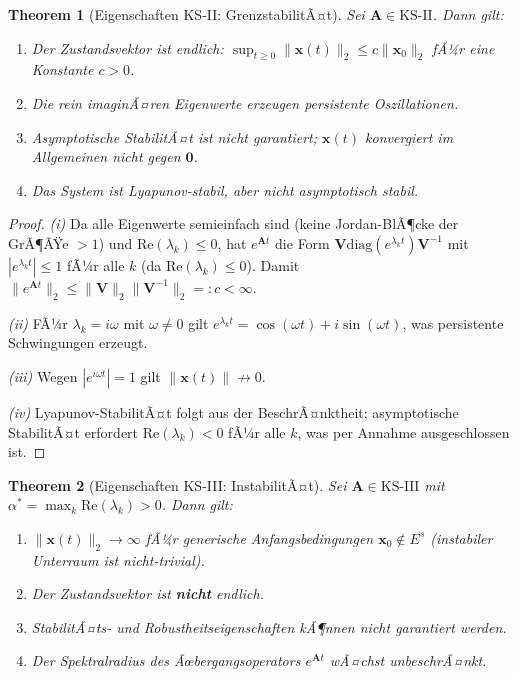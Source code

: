 ﻿\documentclass[12pt, a4paper, titlepage]{report}
\newtheorem{theorem}{Theorem}[section]
\theoremstyle{definition}
\theoremstyle{remark}
\newcommand{\vx}{\bm{x}}
\newcommand{\vA}{\bm{A}}
\newcommand{\vV}{\bm{V}}
\newcommand{\re}{\mathrm{Re}}
\newcommand{\diag}{\mathrm{diag}}
\newcommand{\KS}{\mathrm{KS}}
\begin{document}
\begin{theorem}[Eigenschaften KS-II: GrenzstabilitÃ¤t]
\label{thm:ks2}
Sei $\vA \in \KS\text{-II}$. Dann gilt:
\begin{enumerate}[label=(\roman*)]
  \item Der Zustandsvektor ist endlich: $\sup_{t\geq 0}\|\vx(t)\|_2 \leq c\|\vx_0\|_2$
    fÃ¼r eine Konstante $c > 0$.
  \item Die rein imaginÃ¤ren Eigenwerte erzeugen persistente Oszillationen.
  \item Asymptotische StabilitÃ¤t ist nicht garantiert; $\vx(t)$ konvergiert im
    Allgemeinen nicht gegen $\bm{0}$.
  \item Das System ist Lyapunov-stabil, aber nicht asymptotisch stabil.
\end{enumerate}
\end{theorem}

\begin{proof}
\textit{(i)} Da alle Eigenwerte semieinfach sind (keine Jordan-BlÃ¶cke der GrÃ¶ÃŸe $> 1$)
und $\re(\lambda_k) \leq 0$, hat $e^{\vA t}$ die Form $\vV\diag(e^{\lambda_k t})\vV^{-1}$
mit $|e^{\lambda_k t}| \leq 1$ fÃ¼r alle $k$ (da $\re(\lambda_k) \leq 0$). Damit
$\|e^{\vA t}\|_2 \leq \|\vV\|_2\|\vV^{-1}\|_2 =: c < \infty$.

\textit{(ii)} FÃ¼r $\lambda_k = i\omega$ mit $\omega \neq 0$ gilt
$e^{\lambda_k t} = \cos(\omega t) + i\sin(\omega t)$, was persistente Schwingungen erzeugt.

\textit{(iii)} Wegen $|e^{i\omega t}| = 1$ gilt $\|\vx(t)\| \not\to 0$.

\textit{(iv)} Lyapunov-StabilitÃ¤t folgt aus der BeschrÃ¤nktheit; asymptotische StabilitÃ¤t
erfordert $\re(\lambda_k) < 0$ fÃ¼r alle $k$, was per Annahme ausgeschlossen ist. \qedhere
\end{proof}

\begin{theorem}[Eigenschaften KS-III: InstabilitÃ¤t]
\label{thm:ks3}
Sei $\vA \in \KS\text{-III}$ mit $\alpha^* = \max_k\re(\lambda_k) > 0$. Dann gilt:
\begin{enumerate}[label=(\roman*)]
  \item $\|\vx(t)\|_2 \to \infty$ fÃ¼r generische Anfangsbedingungen
    $\vx_0 \notin E^s$ (instabiler Unterraum ist nicht-trivial).
  \item Der Zustandsvektor ist \textbf{nicht} endlich.
  \item StabilitÃ¤ts- und Robustheitseigenschaften kÃ¶nnen nicht garantiert werden.
  \item Der Spektralradius des Ãœbergangsoperators $e^{\vA t}$ wÃ¤chst unbeschrÃ¤nkt.
\end{enumerate}
\end{theorem}
\end{document}
